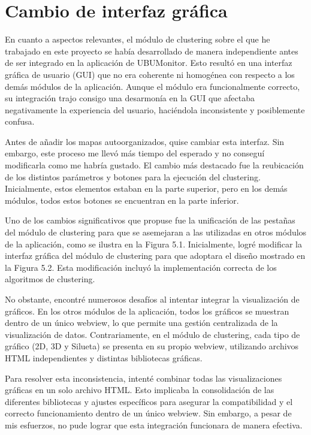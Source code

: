 
\section{Cambio de interfaz gráfica}

En cuanto a aspectos relevantes, el módulo de clustering sobre el que he trabajado en este proyecto se había desarrollado de manera independiente antes de ser integrado en la aplicación de UBUMonitor. Esto resultó en una interfaz gráfica de usuario (GUI) que no era coherente ni homogénea con respecto a los demás módulos de la aplicación. Aunque el módulo era funcionalmente correcto, su integración trajo consigo una desarmonía en la GUI que afectaba negativamente la experiencia del usuario, haciéndola inconsistente y posiblemente confusa.

Antes de añadir los mapas autoorganizados, quise cambiar esta interfaz. Sin embargo, este proceso me llevó más tiempo del esperado y no conseguí modificarla como me habría gustado. El cambio más destacado fue la reubicación de los distintos parámetros y botones para la ejecución del clustering. Inicialmente, estos elementos estaban en la parte superior, pero en los demás módulos, todos estos botones se encuentran en la parte inferior.

Uno de los cambios significativos que propuse fue la unificación de las pestañas del módulo de clustering para que se asemejaran a las utilizadas en otros módulos de la aplicación, como se ilustra en la Figura 5.1. Inicialmente, logré modificar la interfaz gráfica del módulo de clustering para que adoptara el diseño mostrado en la Figura 5.2. Esta modificación incluyó la implementación correcta de los algoritmos de clustering.


No obstante, encontré numerosos desafíos al intentar integrar la visualización de gráficos. En los otros módulos de la aplicación, todos los gráficos se muestran dentro de un único webview, lo que permite una gestión centralizada de la visualización de datos. Contrariamente, en el módulo de clustering, cada tipo de gráfico (2D, 3D y Silueta) se presenta en su propio webview, utilizando archivos HTML independientes y distintas bibliotecas gráficas.

Para resolver esta inconsistencia, intenté combinar todas las visualizaciones gráficas en un solo archivo HTML. Esto implicaba la consolidación de las diferentes bibliotecas y ajustes específicos para asegurar la compatibilidad y el correcto funcionamiento dentro de un único webview. Sin embargo, a pesar de mis esfuerzos, no pude lograr que esta integración funcionara de manera efectiva.

